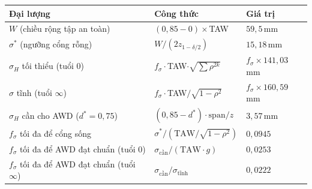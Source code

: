 
\begin{tabular}{@{}lll@{}}
\toprule
Đại lượng & Công thức & Giá trị \\
\midrule
$W$ (chiều rộng tập an toàn) & $(0{,}85-0)\times$TAW & $59{,}5$\,mm \\
$\sigma^{*}$ (ngưỡng cổng rỗng) & $W/(2z_{1-\delta/2})$ & $15{,}18$\,mm \\
$\sigma_H$ tối thiểu (tuổi 0) & $f_\sigma\cdot$TAW$\cdot\sqrt{\sum\rho^{2k}}$ & $f_\sigma\times141{,}03$\,mm \\
$\sigma$ tĩnh (tuổi $\infty$) & $f_\sigma\cdot$TAW$/\sqrt{1-\rho^2}$ & $f_\sigma\times160{,}59$\,mm \\
$\sigma_H$ cần cho AWD ($d^*=0{,}75$) & $(0{,}85-d^{*})\cdot$$\mathrm{span}/z$ & $3{,}57$\,mm \\
$f_\sigma$ tối đa để cổng sống & $\sigma^{*}/(\mathrm{TAW}/\sqrt{1-\rho^2})$ & $0{,}0945$ \\
$f_\sigma$ tối đa để AWD đạt chuẩn (tuổi 0) & $\sigma_{\text{cần}}/(\mathrm{TAW}\cdot g)$ & $0{,}0253$ \\
$f_\sigma$ tối đa để AWD đạt chuẩn (tuổi $\infty$) & $\sigma_{\text{cần}}/\sigma_{\text{tĩnh}}$ & $0{,}0222$ \\
\bottomrule
\end{tabular}
